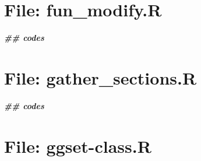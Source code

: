 \documentclass[
]{article}
\newenvironment{Shaded}{\begin{snugshade}}{\end{snugshade}}
\newcommand{\DocumentationTok}[1]{\textcolor[rgb]{0.56,0.35,0.01}{\textbf{\textit{#1}}}}
\begin{document}
\hypertarget{file-fun_modify.r}{%
\section{File: fun\_modify.R}\label{file-fun_modify.r}}

\begin{Shaded}
\begin{Highlighting}[]
\DocumentationTok{\#\# codes}
\end{Highlighting}
\end{Shaded}

\hypertarget{file-gather_sections.r}{%
\section{File: gather\_sections.R}\label{file-gather_sections.r}}

\begin{Shaded}
\begin{Highlighting}[]
\DocumentationTok{\#\# codes}
\end{Highlighting}
\end{Shaded}

\hypertarget{file-ggset-class.r}{%
\section{File: ggset-class.R}\label{file-ggset-class.r}}
\end{document}
